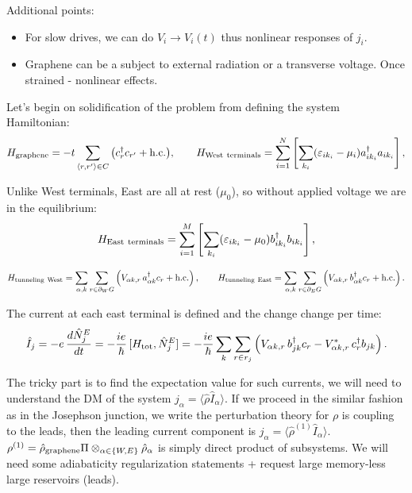 \documentclass[aps, prb, superscriptaddress, longbibliography]{revtex4-2}
\renewcommand{\epsilon}{\varepsilon}
\numberwithin{equation}{section}
\begin{document}
    Additional points:
    \begin{itemize}
        \item For slow drives, we can do $V_i\rightarrow V_i(t)$ thus nonlinear responses of $j_i$.
        \item Graphene can be a subject to external radiation or a transverse voltage. Once strained - nonlinear effects.
    \end{itemize}

    Let's begin on solidification of the problem from defining the system Hamiltonian:
    \begin{equation}
    H_{\rm graphene}
    = -t\sum_{\langle r,r'\rangle\in C}\big(c_r^\dagger c_{r'} + \text{h.c.}\big)
     ,\qquad H_{\rm West~terminals} =\sum_{i=1}^N\left[\sum_{k_i} (\epsilon_{i {k_i}}-\mu_i) a_{i {k_i}}^\dagger a_{i {k_i}}\right], 
    \end{equation}

    Unlike West terminals, East are all at rest ($\mu_0$), so without applied voltage we are in the equilibrium:
    \begin{equation}
     H_{\rm East~terminals} =\sum_{i=1}^M\left[\sum_{k_i} (\epsilon_{i {k_i}}-\mu_0) b_{i{k_i}}^\dagger b_{i {k_i}}\right],  
    \end{equation}
    
    \begin{equation}
    H_{\rm tunneling~West}
    = \sum_{\alpha,k}\sum_{r\in\partial_W G}
    \left(V_{\alpha k,r}\, a_{\alpha k}^\dagger c_r + \text{h.c.}\right),\qquad H_{\rm tunneling~East}
    = \sum_{\alpha,k}\sum_{r\in\partial_E G}
    \left(V_{\alpha k,r}\, b_{\alpha k}^\dagger c_r + \text{h.c.}\right).
    \end{equation}
    
    The current at each east terminal is defined and the change change per time:
    \begin{equation}
    \hat I_j
    = -e\,\frac{d\hat N^E_j}{dt}
    = -\frac{ie}{\hbar}\,[H_{\rm tot},\hat N^E_j]
    = -\frac{ie}{\hbar}\sum_{k}\sum_{r\in{r_j}}
    \left(V_{\alpha k,r}\, b_{j k}^\dagger c_r
    - V_{\alpha k,r}^*\, c_r^\dagger b_{j k}\right).
    \end{equation}
    
    The tricky part is to find the expectation value for such currents, we will need to understand the DM of the system $j_\alpha = \langle \hat \rho \hat{I}_\alpha \rangle.$ If we proceed in the similar fashion as in the Josephson junction, we write the perturbation theory for $\rho$ is coupling to the leads, then the leading current component is $j_\alpha = \langle \hat \rho^{(1)} \hat{I}_\alpha \rangle.$ $ \rho^{(1)} =\hat{\rho}_{\rm graphene}\Pi\otimes_{\alpha\in\{W,E\}}\hat{\rho}_\alpha $ is simply direct product of subsystems. We will need some adiabaticity regularization statements + request large memory-less large reservoirs (leads). 
\end{document}
